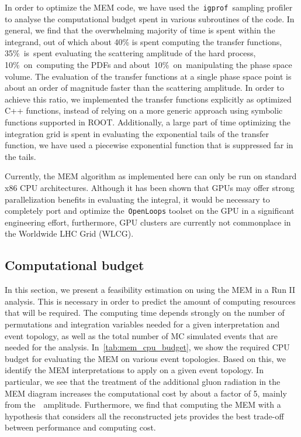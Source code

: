 In order to optimize the MEM code, we have used the~\texttt{igprof}~sampling profiler~\cite{Eulisse:2005zz,Tuura:2008zza} to analyse the computational budget spent in various subroutines of the code. In general, we find    
that the overwhelming majority of time is spent within the integrand, out of which about 40\% is spent computing the transfer functions, 35\%~is~spent evaluating the scattering amplitude of the hard process, 10\%~on~computing the PDFs and about~10\%~on~manipulating the phase space volume. The evaluation of the transfer functions at a single phase space point is about an order of magnitude faster than the scattering amplitude. In order to achieve this ratio, we implemented the transfer functions explicitly as optimized C++ functions, instead of relying on a more generic approach using symbolic functions supported in ROOT. Additionally, a large part of time optimizing the integration grid is spent in evaluating the exponential tails of the transfer function, we have used a piecewise exponential function that is suppressed far in the tails.

Currently, the MEM algorithm as implemented here can only be run on standard x86 CPU architectures. Although it has been shown that GPUs may offer strong parallelization benefits in evaluating the integral, it would be necessary to completely port and optimize the~\texttt{OpenLoops} toolset on the GPU in a significant engineering effort\cite{Schouten:2014yza}, furthermore, GPU clusters are currently not commonplace in the Worldwide LHC Grid (WLCG).

\subsection{Computational budget}
\label{sec:mem_computational}
In this section, we present a feasibility estimation on using the MEM in a Run II analysis. This is necessary in order to predict the amount of computing resources that will be required. The computing time depends strongly on the number of permutations and integration variables needed for a given interpretation and event topology, as well as the total number of MC simulated events that are needed for the analysis. In~\cref{tab:mem_cpu_budget}, we show the required CPU budget for evaluating the MEM on various event topologies. Based on this, we identify the MEM interpretations to apply on a given event topology. In particular, we see that the treatment of the additional gluon radiation in the MEM diagram increases the computational cost by about a factor of 5, mainly from the~\ttbb~amplitude. Furthermore, we find that computing the MEM with a hypothesis that considers all the reconstructed jets provides the best trade-off between performance and computing cost.

